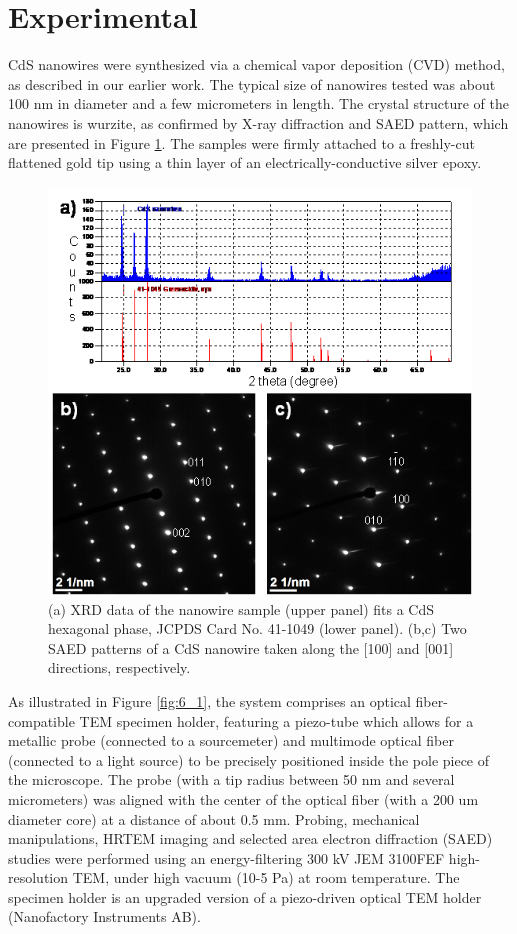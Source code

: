 \section{Experimental}
CdS nanowires were synthesized via a chemical vapor deposition (CVD) method, as described in our earlier work.\cite{Zhang2015} The typical size of nanowires tested was about 100 nm in diameter and a few micrometers in length. The crystal structure of the nanowires is wurzite, as confirmed by X-ray diffraction and SAED pattern, which are presented in Figure \ref{fig:6_s1}. The samples were firmly attached to a freshly-cut flattened gold tip using a thin layer of an electrically-conductive silver epoxy. \\

\begin{figure}  
\includegraphics[width=\textwidth]{figures/figure6_s1}
\caption[CdS crystallography]
{(a) XRD data of the nanowire sample (upper panel) fits a CdS hexagonal phase, JCPDS Card No. 41-1049 (lower panel). (b,c) Two SAED patterns of a CdS nanowire taken along the [100] and [001] directions, respectively. 
\label{fig:6_s1}}
\end{figure}


As illustrated in Figure \ref{fig:6_1}, the system comprises an optical fiber-compatible TEM specimen holder, featuring a piezo-tube which allows for a metallic probe (connected to a sourcemeter) and multimode optical fiber (connected to a light source) to be precisely positioned inside the pole piece of the microscope. The probe (with a tip radius between 50 nm and several micrometers) was aligned with the center of the optical fiber (with a 200 um diameter core) at a distance of about 0.5 mm. Probing, mechanical manipulations, HRTEM imaging and selected area electron diffraction (SAED) studies were performed using an energy-filtering 300 kV JEM 3100FEF high-resolution TEM, under high vacuum (10-5 Pa) at room temperature. The specimen holder is an upgraded version of a piezo-driven optical TEM holder (Nanofactory Instruments AB).\\

